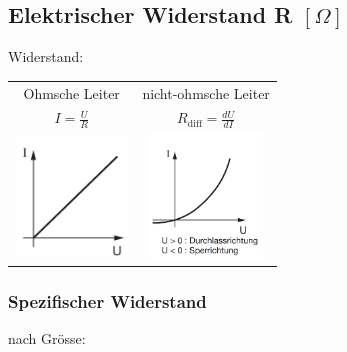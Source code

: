 \subsection{Elektrischer Widerstand R \hfill $[\Omega]$}
    Widerstand: 

    \begin{tabular}{c c}
        Ohmsche Leiter & nicht-ohmsche Leiter \\
        $I = \frac{U}{R}$ & $R_{\text{diff}} = \frac{dU}{dI}$\\
        \includegraphics[width = 30mm]{src/images/plot_ohmscher_leiter.png} & \includegraphics[width = 30mm]{src/images/plot_nicht-ohmscher_leiter.png}
    \end{tabular}
    \vfill

    \subsubsection{Spezifischer Widerstand}
        nach Grösse:

